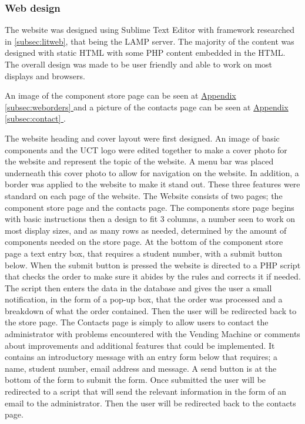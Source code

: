 \documentclass[a4paper,11pt]{article}
\newcommand*{\fullref}[1]{\hyperref[{#1}]{\Appendixautorefname  \ref*{#1} \nameref*{#1}}}
\newcommand*{\Appendixautorefname}{Appendix }
\numberwithin{figure}{section}
\numberwithin{table}{section}
\begin{document}
\subsubsection{Web design}
\label{subsubsec:webdev}

The website was designed using Sublime Text Editor with framework researched in \autoref{subsec:litweb}, that being the LAMP server. The majority of the content was designed with static HTML with some PHP content embedded in the HTML. The overall design was made to be user friendly and able to work on most displays and browsers.

An image of the component store page can be seen at \fullref{subsec:weborders} and a picture of the contacts page can be seen at \fullref{subsec:contact}.

The website heading and cover layout were first designed. An image of basic components and the UCT logo were edited together to make a cover photo for the website and represent the topic of the website. A menu bar was placed underneath this cover photo to allow for navigation on the website. In addition, a border was applied to the website to make it stand out. These three features were standard on each page of the website. The Website consists of two pages; the component store page and the contacts page. The components store page begins with basic instructions then a design to fit 3 columns, a number seen to work on most display sizes, and as many rows as needed, determined by the amount of components needed on the store page. At the bottom of the component store page a text entry box, that requires a student number, with a submit button below. When the submit button is pressed the website is directed to a PHP script that checks the order to make sure it abides by the rules and corrects it if needed. The script then enters the data in the database and gives the user a small notification, in the form of a pop-up box, that the order was processed and a breakdown of what the order contained. Then the user will be redirected back to the store page. The Contacts page is simply to allow users to contact the administrator with problems encountered with the Vending Machine or comments about improvements and additional features that could be implemented. It contains an introductory message with an entry form below that requires; a name, student number, email address and message. A send button is at the bottom of the form to submit the form. Once submitted the user will be redirected to a script that will send the relevant information in the form of an email to the administrator. Then the user will be redirected back to the contacts page.
\end{document}
